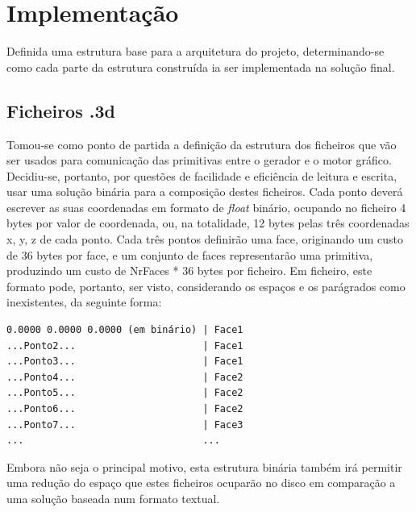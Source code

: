 \section{Implementação}

Definida uma estrutura base para a arquitetura do projeto,
determinando-se como cada parte da estrutura construída ia ser
implementada na solução final.

\subsection{Ficheiros .3d}

Tomou-se como ponto de partida a definição da estrutura dos ficheiros que
vão ser usados para comunicação das primitivas entre o gerador e o motor
gráfico.\newline
\break
\noindent
Decidiu-se, portanto, por questões de facilidade e eficiência de leitura
e escrita, usar uma solução binária para a composição destes
ficheiros.\newline
\break
\noindent
Cada ponto deverá escrever as suas coordenadas em formato de
\textit{float} binário, ocupando no ficheiro 4 bytes por
valor de coordenada, ou, na totalidade, 12 bytes pelas três
coordenadas x, y, z de cada ponto.\newline
\break
\noindent
Cada três pontos definirão uma face, originando um custo de 36 bytes
por face, e um conjunto de faces representarão uma primitiva,
produzindo um custo de NrFaces * 36 bytes por ficheiro.\newline
\break
\noindent
Em ficheiro, este formato pode, portanto, ser visto, considerando
os espaços e os parágrados como inexistentes, da seguinte forma:\newline

\begin{tcolorbox}[
    colback=gray!10!white,
    colframe=black!50!black,
    after upper={\hfill\textbf{.3d simplificado}}
]
\begin{verbatim}
0.0000 0.0000 0.0000 (em binário) | Face1
...Ponto2...                      | Face1
...Ponto3...                      | Face1
...Ponto4...                      | Face2
...Ponto5...                      | Face2
...Ponto6...                      | Face2
...Ponto7...                      | Face3
...                               ...
\end{verbatim}
\end{tcolorbox}

\break
\noindent
Embora não seja o principal motivo, esta estrutura binária também irá
permitir uma redução do espaço que estes ficheiros ocuparão no disco em
comparação a uma solução baseada num formato textual.\newline

